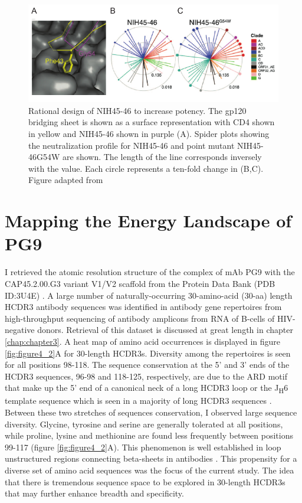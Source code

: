 \begin{figure}
   \centering
   \includegraphics{images/chapter4/figure4_1.pdf} %
   \caption[Rational Design of NIH45-46 to Increase Potency]{Rational design of NIH45-46 to increase potency. The gp120 bridging sheet is shown as a surface representation with CD4 shown in yellow and NIH45-46 shown in purple (A). Spider plots showing the neutralization profile for NIH45-46 and point mutant NIH45-46G54W are shown. The length of the line corresponds inversely with the \ic value. Each circle represents a ten-fold change in \ic (B,C). Figure adapted from \citep{Diskin:2011hl}}
   \label{fig:figure4_1}
\end{figure}

\section{Mapping the Energy Landscape of PG9}
\label{sec:mapping}
I retrieved the atomic resolution structure of the complex of mAb PG9 with the CAP45.2.00.G3 variant V1/V2 scaffold from the Protein Data Bank (PDB ID:3U4E) \citep{McLellan:2011dg}. A large number of naturally-occurring 30-amino-acid (30-aa) length HCDR3 antibody sequences was identified in antibody gene repertoires from high-throughput sequencing of antibody amplicons from RNA of B-cells of HIV-negative donors. Retrieval of this dataset is discussed at great length in chapter \ref{chap:chapter3}. A heat map of amino acid occurrences is displayed in figure \ref{fig:figure4_2}A for 30-length HCDR3s. Diversity among the repertoires is seen for all positions 98-118. The sequence conservation at the 5' and 3' ends of the HCDR3 sequences, 96-98 and 118-125, respectively, are due to the ARD motif that make up the 5' end of a canonical neck of a long HCDR3 loop or the J\textsubscript{H}6 template sequence which is seen in a majority of long HCDR3 sequences \citep{North:2011dv,Briney:2012ib}. Between these two stretches of sequences conservation, I observed large sequence diversity. Glycine, tyrosine and serine are generally tolerated at all positions, while proline, lysine and methionine are found less frequently between positions 99-117 (figure \ref{fig:figure4_2}A). This phenomenon is well established in loop unstructured regions connecting beta-sheets in antibodies \citep{Minuchehr:2005wc,De:2005in}.  This propensity for a diverse set of amino acid sequences was the focus of the current study. The idea that there is tremendous sequence space to be explored in 30-length HCDR3s that may further enhance breadth and specificity.


